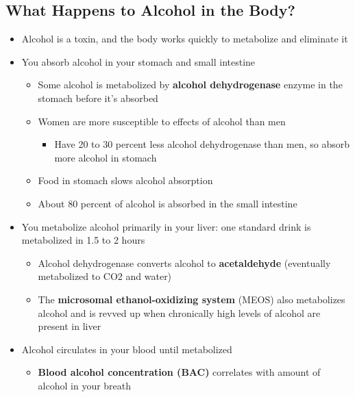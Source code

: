 \documentclass[12pt]{article}
\begin{document}
        \subsection{What Happens to Alcohol in the Body?}
            \begin{itemize}
                \item Alcohol is a toxin, and the body works quickly to metabolize and eliminate it
                \item You absorb alcohol in your stomach and small intestine
                    \begin{itemize}
                        \item Some alcohol is metabolized by \textbf{alcohol dehydrogenase} enzyme in the stomach before it's absorbed
                        \item Women are more susceptible to effects of alcohol than men
                            \begin{itemize}
                                \item Have 20 to 30 percent less alcohol dehydrogenase than men, so absorb more alcohol in stomach
                            \end{itemize}
                        \item Food in stomach slows alcohol absorption
                        \item About 80 percent of alcohol is absorbed in the small intestine
                    \end{itemize}
                \item You metabolize alcohol primarily in your liver: one standard drink is metabolized in 1.5 to 2 hours
                    \begin{itemize}
                        \item Alcohol dehydrogenase converts alcohol to \textbf{acetaldehyde} (eventually metabolized to CO2 and water)
                        \item The \textbf{microsomal ethanol-oxidizing system} (MEOS) also metabolizes alcohol and is revved up when chronically high levels of alcohol are present in liver
                    \end{itemize}
                \item Alcohol circulates in your blood until metabolized
                    \begin{itemize}
                        \item \textbf{Blood alcohol concentration (BAC)} correlates with amount of alcohol in your breath

\end{itemize}
\end{itemize}
\end{document}
